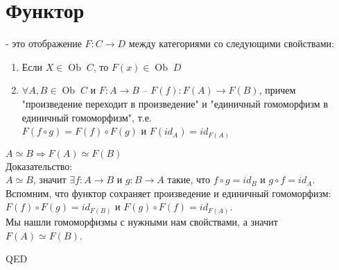 \documentclass[a4paper]{article}
\theoremstyle{indented}
\theoremstyle{definition}
\theoremstyle{remark}
\DeclareMathOperator{\ra}{\rightarrow}
\DeclareMathOperator{\Ra}{\Rightarrow}
\DeclareMathOperator{\Ob}{Ob}
\begin{document}
\section{Функтор}
 {} - это отображение $F: C \ra D$ между категориями со следующими свойствами:
\begin{enumerate}
    \item Если $X \in\Ob\;C$, то $F(x) \in\Ob\;D$
    \item $\forall A, B \in\Ob\;C$ и $F: A \ra B$ -- $F(f): F(A) \ra F(B)$, причем "произведение переходит в произведение" и "единичный гомоморфизм в единичный гомоморфизм", т.е. \\
    $F(f \circ g) = F(f) \circ F(g)$ и $F(id_A) = id_{F(A)}$
\end{enumerate}
\stat $A \simeq B \Ra F(A) \simeq F(B)$ \\
Доказательство: \\
$A \simeq B$, значит $\exists f: A \ra B$ и $g: B \ra A$ такие, что 
$f \circ g = id_B$ и $g \circ f = id_A$. \\
Вспомним, что функтор сохраняет произведение и единичный гомоморфизм: \\
$F(f) \circ F(g) = id_{F(B)}$ и $F(g) \circ F(f) = id_{F(A)}$. \\
Мы нашли гомоморфизмы с нужными нам свойствами, а значит $F(A) \simeq F(B)$.\\
\begin{flushright}
QED
\end{flushright}
\end{document}
